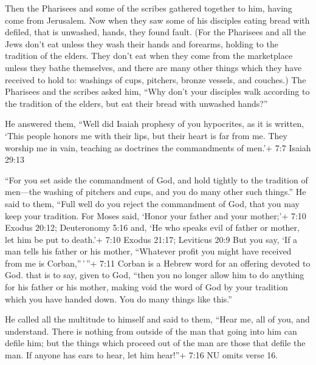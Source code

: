  Then the Pharisees and some of the scribes gathered
together to him, having come from Jerusalem.  Now when they
saw some of his disciples eating bread with defiled, that is unwashed,
hands, they found fault.  (For the Pharisees and all the
Jews don't eat unless they wash their hands and forearms, holding to the
tradition of the elders.  They don't eat when they come from
the marketplace unless they bathe themselves, and there are many other
things which they have received to hold to: washings of cups, pitchers,
bronze vessels, and couches.)  The Pharisees and the scribes
asked him, ``Why don't your disciples walk according to the tradition of
the elders, but eat their bread with unwashed hands?''

 He answered them, ``Well did Isaiah prophesy of you
hypocrites, as it is written, `This people honors me with their lips,
but their heart is far from me.  They worship me in vain,
teaching as doctrines the commandments of men.'+ 7:7 Isaiah 29:13

 ``For you set aside the commandment of God, and hold
tightly to the tradition of men---the washing of pitchers and cups, and
you do many other such things.''  He said to them, ``Full
well do you reject the commandment of God, that you may keep your
tradition.  For Moses said, `Honor your father and your
mother;'+ 7:10 Exodus 20:12; Deuteronomy 5:16 and, `He who speaks evil
of father or mother, let him be put to death.'+ 7:10 Exodus 21:17;
Leviticus 20:9  But you say, `If a man tells his father or
his mother, ``Whatever profit you might have received from me is
Corban,''\,'\,''+ 7:11 Corban is a Hebrew word for an offering devoted
to God. that is to say, given to God,  ``then you no longer
allow him to do anything for his father or his mother, 
making void the word of God by your tradition which you have handed
down. You do many things like this.''

 He called all the multitude to himself and said to them,
``Hear me, all of you, and understand.  There is nothing
from outside of the man that going into him can defile him; but the
things which proceed out of the man are those that defile the man.
 If anyone has ears to hear, let him hear!''+ 7:16 NU omits
verse 16.


